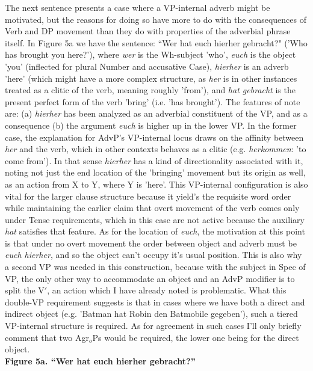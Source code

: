 \documentclass[12pt]{article}
\begin{document}
\begin{flushleft}
The next sentence presents a case where a VP-internal adverb might be motivated, but the reasons for doing so have more to do with the consequences of Verb and DP movement than they do with properties of the adverbial phrase itself. In Figure 5a we have the sentence: ``Wer hat euch hierher gebracht?" ('Who has brought you here?'), where {\it wer} is the Wh-subject 'who', {\it euch} is the object 'you' (inflected for plural Number and accusative Case), {\it hierher} is an adverb 'here' (which might have a more complex structure, as {\it her} is in other instances treated as a clitic of the verb, meaning roughly 'from'), and {\it hat gebracht} is the present perfect form of the verb 'bring' (i.e. 'has brought'). The features of note are: (a) {\it hierher} has been analyzed as an adverbial constituent of the VP, and as a consequence (b) the argument {\it euch} is higher up in the lower VP. In the former case, the explanation for AdvP's VP-internal locus draws on the affinity between {\it her} and the verb, which in other contexts behaves as a clitic (e.g. {\it herkommen}: 'to come from'). In that sense {\it hierher} has a kind of directionality associated with it, noting not just the end location of the 'bringing' movement but its origin as well, as an action from X to Y, where Y is 'here'. This VP-internal configuration is also vital for the larger clause structure because it yield's the requisite word order while maintaining the earlier claim that overt movement of the verb comes only under Tense requirements, which in this case are not active because the auxiliary {\it hat} satisfies that feature. As for the location of {\it euch}, the motivation at this point is that under no overt movement the order between object and adverb must be {\it euch hierher}, and so the object can't occupy it's usual position. This is also why a second VP was needed in this construction, because with the subject in Spec of VP, the only other way to accommodate an object and an AdvP modifier is to split the V$'$, an action which I have already noted is problematic. What this double-VP requirement suggests is that in cases where we have both a direct and indirect object (e.g. 'Batman hat Robin den Batmobile gegeben'), such a tiered VP-internal structure is required. As for agreement in such cases I'll only briefly comment that two Agr$_o$Ps would be required, the lower one being for the direct object. \\
\newpage
{\bf Figure 5a. ``Wer hat euch hierher gebracht?''}\\
\bigskip
{\centering
\begin{tikzpicture}

\end{tikzpicture}}
\end{flushleft}
\end{document}
